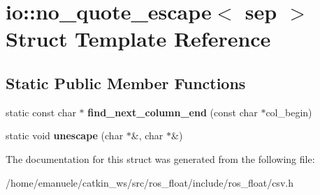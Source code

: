 \hypertarget{structio_1_1no__quote__escape}{}\section{io\+:\+:no\+\_\+quote\+\_\+escape$<$ sep $>$ Struct Template Reference}
\label{structio_1_1no__quote__escape}
\subsection*{Static Public Member Functions}
\begin{DoxyCompactItemize}
\item 
\mbox{\label{structio_1_1no__quote__escape_add17b043bb89445079a0448026ce86d0}} 
static const char $\ast$ {\bfseries find\+\_\+next\+\_\+column\+\_\+end} (const char $\ast$col\+\_\+begin)
\item 
\mbox{\label{structio_1_1no__quote__escape_af1c217f2c995d178a91c58235191b052}} 
static void {\bfseries unescape} (char $\ast$\&, char $\ast$\&)
\end{DoxyCompactItemize}


The documentation for this struct was generated from the following file\+:\begin{DoxyCompactItemize}
\item 
/home/emanuele/catkin\+\_\+ws/src/ros\+\_\+float/include/ros\+\_\+float/csv.\+h\end{DoxyCompactItemize}
